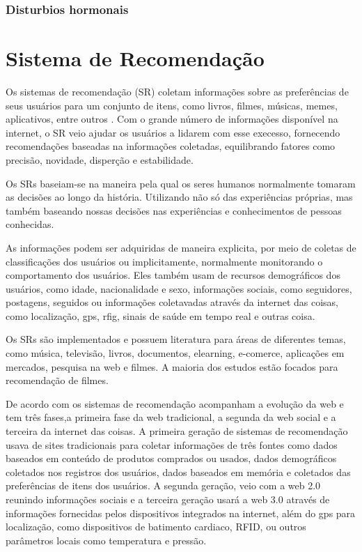 \subsubsection{Disturbios hormonais}

\section{Sistema de Recomendação}

Os sistemas de recomendação (SR) coletam informações sobre as preferências de seus usuários para um conjunto de itens, como livros, filmes, músicas, memes, aplicativos, entre outros \cite{bobadilla2013}. Com o grande número de informações disponível na internet, o SR veio ajudar os usuários a lidarem com esse execesso, fornecendo recomendações baseadas na informações coletadas, equilibrando fatores como precisão, novidade, disperção e estabilidade.

Os SRs baseiam-se na maneira pela qual os seres humanos normalmente tomaram as decisões ao longo da história. Utilizando não só das experiências próprias, mas também baseando nossas decisões nas experiências e conhecimentos de pessoas conhecidas.

As informações podem ser adquiridas de maneira explicita, por meio de coletas de classificações dos usuários ou implicitamente, normalmente monitorando o comportamento dos usuários. Eles também usam de recursos demográficos dos usuários, como idade, nacionalidade e sexo, informações sociais, como seguidores, postagens, seguidos ou informações coletavadas através da internet das coisas, como localização, gps, rfig, sinais de saúde em tempo real e outras coisa.

Os SRs são implementados e possuem literatura para áreas de diferentes temas, como música, televisão, livros, documentos, elearning, e-comerce, aplicações em mercados, pesquisa na web e filmes. A maioria dos estudos estão focados para recomendação de filmes.

De acordo com  os sistemas de recomendação acompanham a evolução da web e tem três fases,a primeira fase da web tradicional, a segunda da web social e a terceira da internet das coisas. A primeira geração de sistemas de recomendação usava de sites tradicionais para coletar informações de três fontes como dados baseados em conteúdo de produtos comprados ou usados, dados demográficos coletados nos registros dos usuários, dados baseados em memória e coletados das preferências de itens dos usuários. A segunda geração, veio com a web 2.0 reunindo informações sociais e a terceira geração usará a web 3.0 através de informações fornecidas pelos dispositivos integrados na internet, além do gps para localização, como dispositivos de batimento cardiaco, RFID, ou outros parâmetros locais como temperatura e pressão.

